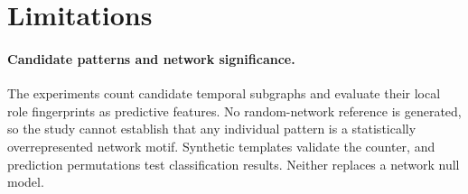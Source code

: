 \section{Limitations}

\paragraph{Candidate patterns and network significance.}
The experiments count candidate temporal subgraphs and evaluate their local
role fingerprints as predictive features. No random-network reference is
generated, so the study cannot establish that any individual pattern is a
statistically overrepresented network motif. Synthetic templates validate the
counter, and prediction permutations test classification results. Neither
replaces a network null model.


